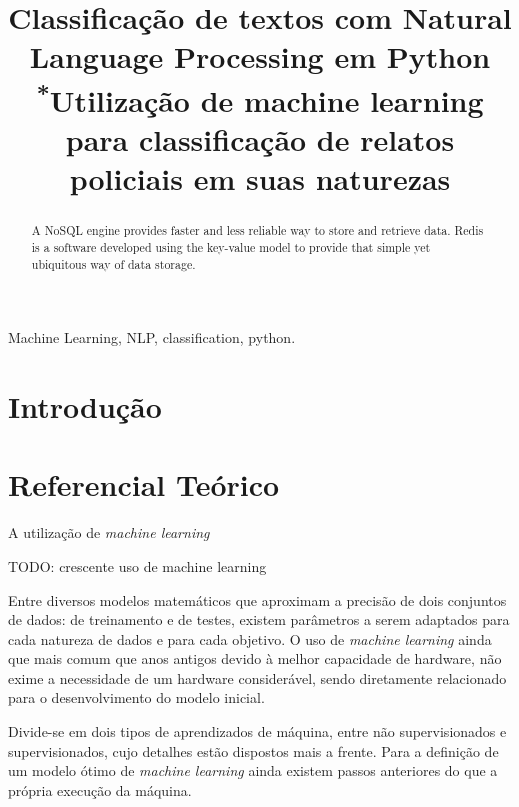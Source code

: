 \documentclass[conference]{IEEEtran}
\begin{document}
\title{Classificação de textos com Natural Language Processing em Python\\
{\footnotesize \textsuperscript{*}Utilização de machine learning para classificação de relatos policiais em suas naturezas}
}


\author{
}

\maketitle

\begin{abstract}
A NoSQL engine provides faster and less reliable way to store and retrieve data. Redis is a software developed using the key-value model to provide that simple yet ubiquitous way of data storage.
\end{abstract}

\begin{IEEEkeywords}
Machine Learning, NLP, classification, python.
\end{IEEEkeywords}

\section{Introdução}

\section{Referencial Teórico}

A utilização de \textit{machine learning} \cite{Sebastiani:2002:MLA:505282.505283} 

TODO: crescente uso de machine learning

Entre diversos modelos matemáticos que aproximam a precisão de dois conjuntos de dados: de treinamento e de testes, existem parâmetros a serem adaptados para cada natureza de dados e para cada objetivo. O uso de \textit{machine learning} ainda que mais comum que anos antigos devido à melhor capacidade de hardware, não exime a necessidade de um hardware considerável, sendo diretamente relacionado para o desenvolvimento do modelo inicial. 

Divide-se em dois tipos de aprendizados de máquina, entre não supervisionados e supervisionados, cujo detalhes estão dispostos mais a frente. Para a definição de um modelo ótimo de \textit{machine learning} ainda existem passos anteriores do que a própria execução da máquina. 
\end{document}
